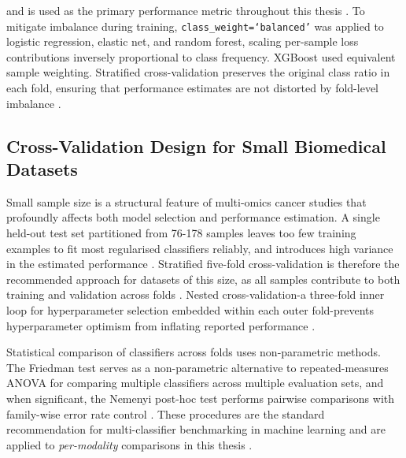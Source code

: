 and is used as the primary performance metric throughout this thesis \parencite{Vabalas2019}. To mitigate imbalance during training, \texttt{class\_weight=`balanced'} was applied to logistic regression, elastic net, and random forest, scaling per-sample loss contributions inversely proportional to class frequency. XGBoost used equivalent sample weighting. Stratified cross-validation preserves the original class ratio in each fold, ensuring that performance estimates are not distorted by fold-level imbalance \parencite{Vabalas2019}.


\subsection{Cross-Validation Design for Small Biomedical Datasets}

Small sample size is a structural feature of multi-omics cancer studies that profoundly affects both model selection and performance estimation. A single held-out test set partitioned from 76-178 samples leaves too few training examples to fit most regularised classifiers reliably, and introduces high variance in the estimated performance \parencite{Vabalas2019}. Stratified five-fold cross-validation is therefore the recommended approach for datasets of this size, as all samples contribute to both training and validation across folds \parencite{Vabalas2019, Demsar2006}. Nested cross-validation-a three-fold inner loop for hyperparameter selection embedded within each outer fold-prevents hyperparameter optimism from inflating reported performance \parencite{Demsar2006}.
 
Statistical comparison of classifiers across folds uses non-parametric methods. The Friedman test serves as a non-parametric alternative to repeated-measures ANOVA for comparing multiple classifiers across multiple evaluation sets, and when significant, the Nemenyi post-hoc test performs pairwise comparisons with family-wise error rate control \parencite{Demsar2006}. These procedures are the standard recommendation for multi-classifier benchmarking in machine learning and are applied to \textit{per-modality} comparisons in this thesis \parencite{Demsar2006}.
